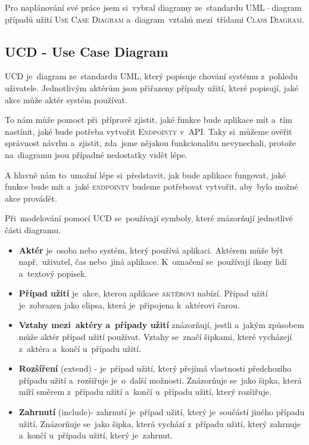 \documentclass[14pt,a4paper]{article}
\begin{document}
        Pro naplánování své práce jsem si~vybral diagramy ze~standardu \textsc{UML}\,--\,diagram případů užití \textsc{Use Case Diagram} a~diagram~vztahů mezi~třídami \textsc{Class Diagram}.

        \subsection{UCD - Use Case Diagram}
        \textsc{UCD} je~diagram ze~standardu \textsc{UML}, který popisuje chování systému z~pohledu uživatele. Jednotlivým aktérům jsou přiřazeny případy užití, které popisují, jaké akce může aktér systém používat.

        To nám může pomoct při~přípravě zjistit,  jaké funkce bude aplikace mít a~tím nastínit, jaké bude potřeba vytvořit \textsc{Endpointy} v~\textsc{API}.
        Taky si~můžeme ověřit správnost návrhu a~zjistit, zda~jsme nějakou funkcionalitu nevynechali, protože na~diagramu jsou případné nedostatky vidět lépe.
        
        A hlavně nám to~umožní lépe si~představit, jak bude aplikace fungovat, jaké funkce bude mít a~jaké \textsc{endpointy} budeme potřebovat vytvořit, aby~bylo možné akce provádět. \parencite{uml:usecase}

        Při~modelování pomocí \textsc{UCD} se~používají symboly, které znázorňují jednotlivé části diagramu.
        \begin{itemize}
            \item \textbf{Aktér} je~osoba nebo systém, který používá aplikaci. Aktérem může být např.~uživatel, čas nebo~jiná aplikace. K~označení se~používají ikony lidí a~textový popisek.
            \item \textbf{Případ užití} je~akce, kterou aplikace \textsc{aktérovi} nabízí. Případ užití je~zobrazen jako elipsa, která je~připojena k~aktérovi čarou.
            \item \textbf{Vztahy mezi~aktéry a~případy užití} znázorňují, jestli a~jakým způsobem může aktér případ užití používat. Vztahy se~značí šipkami, které vycházejí z~aktéra a~končí u~případu užití.
            \item \textbf{Rozšíření} (extend) - je~případ užití, který přejímá vlastnosti předchozího případu užití a~rozšiřuje je~o~další možnosti. Znázorňuje se~jako šipka, která míří směrem z~případu užití a~končí u~případu užití, který rozšiřuje.
            \item \textbf{Zahrnutí} (include)- zahrnutí je~případ užití, který je~součástí jiného případu užití. Znázorňuje se~jako šipka, která vychází z~případu užití, který zahrnuje a~končí u~případu užití, který je~zahrnut.
        \end{itemize}
\end{document}
